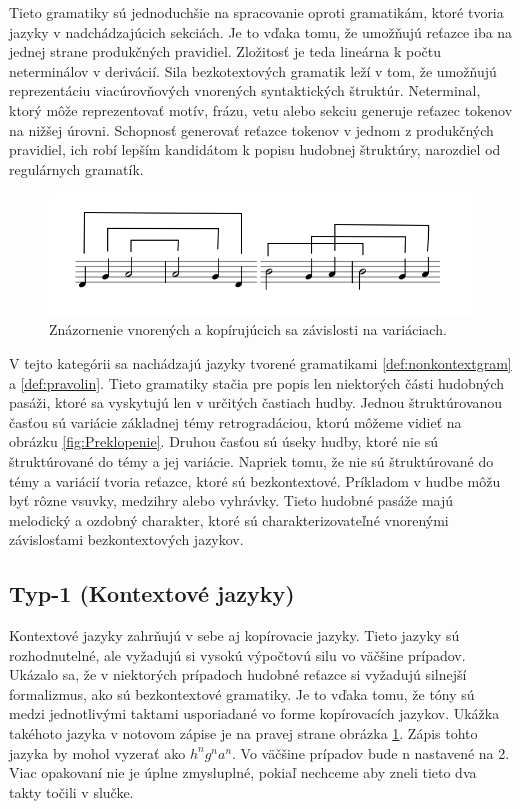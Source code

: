 Tieto gramatiky sú jednoduchšie na spracovanie oproti gramatikám, ktoré tvoria jazyky v nadchádzajúcich sekciách. Je to vďaka tomu, že umožňujú reťazce iba na jednej strane produkčných pravidiel. Zložitosť je teda lineárna k počtu neterminálov v derivácií. Sila bezkotextových gramatik leží v tom, že umožňujú reprezentáciu viacúrovňových vnorených syntaktických štruktúr. Neterminal, ktorý môže reprezentovať motív, frázu, vetu alebo sekciu generuje reťazec tokenov na nižšej úrovni. Schopnosť generovať reťazce tokenov v jednom z produkčných pravidiel, ich robí lepším kandidátom k popisu hudobnej štruktúry, narozdiel od regulárnych gramatík.

\begin{figure}[H]
    \centering
    \includegraphics[scale=0.4]{obrazky-figures/zavislosti.png}
    \caption{Znázornenie vnorených a kopírujúcich sa závislosti na variáciach.}
    \label{fig:dependencies}
\end{figure}

V tejto kategórii sa nachádzajú jazyky tvorené gramatikami \ref{def:nonkontextgram} a \ref{def:pravolin}. Tieto gramatiky stačia pre popis len niektorých části hudobných pasáži, ktoré sa vyskytujú len v určitých častiach hudby. Jednou štruktúrovanou časťou sú variácie základnej témy retrogradáciou, ktorú môžeme vidieť na obrázku \ref{fig:Preklopenie}. Druhou časťou sú úseky hudby, ktoré nie sú štruktúrované do témy a jej variácie. Napriek tomu, že nie sú štruktúrované do témy a variácií tvoria reťazce, ktoré sú bezkontextové. Príkladom v hudbe môžu byť rôzne vsuvky, medzihry alebo vyhrávky. Tieto hudobné pasáže majú melodický a ozdobný charakter, ktoré sú charakterizovateľné vnorenými závislosťami bezkontextových jazykov.

\subsection*{Typ-1 (Kontextové jazyky)}
Kontextové jazyky zahrňujú v sebe aj kopírovacie jazyky. Tieto jazyky sú rozhodnutelné, ale vyžadujú si vysokú výpočtovú silu vo väčšine prípadov. Ukázalo sa, že v niektorých prípadoch hudobné reťazce si vyžadujú silnejší formalizmus, ako sú bezkontextové gramatiky. Je to vďaka tomu, že tóny sú medzi jednotlivými taktami usporiadané vo forme kopírovacích jazykov. Ukážka takéhoto jazyka v notovom zápise je na pravej strane obrázka \ref{fig:dependencies}. Zápis tohto jazyka by mohol vyzerať ako $h^ng^na^n$. Vo väčšine prípadov bude n nastavené na 2. Viac opakovaní nie je úplne zmysluplné, pokiaľ nechceme aby zneli tieto dva takty točili v slučke.

